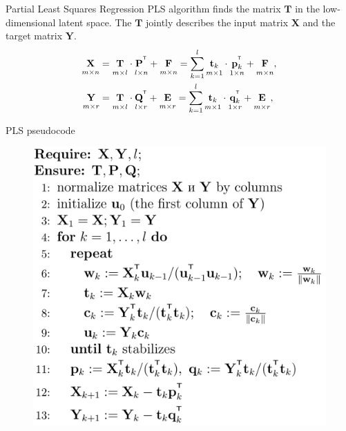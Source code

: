 \documentclass{beamer}
\newcommand{\bY}{\mathbf{Y}}
\newcommand{\bX}{\mathbf{X}}
\newcommand{\bt}{\mathbf{t}}
\newcommand{\bp}{\mathbf{p}}
\newcommand{\bq}{\mathbf{q}}
\newcommand{\bP}{\mathbf{P}}
\newcommand{\bT}{\mathbf{T}}
\newcommand{\bQ}{\mathbf{Q}}
\newcommand{\bE}{\mathbf{E}}
\newcommand{\bF}{\mathbf{F}}
\newcommand{\T}{^{\text{\tiny\sffamily\upshape\mdseries T}}}
\begin{document}
\begin{frame}{Partial Least Squares Regression}
	PLS algorithm finds the matrix $\bT$ in the low-dimensional latent space. The $\bT$ jointly describes the input matrix $\bX$ and the target matrix $\bY$.
	\begin{align*}
	\underset{m \times n}{\vphantom{\bQ}\bX} 
	&= \underset{m \times l}{\vphantom{\bQ}\bT} \cdot \underset{l \times n}{\vphantom{\bQ}\bP^{\T}} + \underset{m \times n}{\vphantom{\bQ}\bF} 
	= \sum_{k=1}^l \underset{m \times 1}{\vphantom{\bp_k^{\T}}\bt_k} \cdot \underset{1 \times n}{\bp_k^{\T}} + \underset{m \times n}{\vphantom{\bp_k^{\T}}\bF},\\
	\underset{m \times r}{\vphantom{\bQ}\bY} 
	&= \underset{m \times l}{\vphantom{\bQ}\bT} \cdot \underset{l \times r}{\bQ^{\T}} + \underset{m \times r}{\vphantom{\bQ}\bE}
	=  \sum_{k=1}^l  \underset{m \times 1}{\vphantom{\bq_k^{\T}}\bt_k} \cdot \underset{1 \times r}{\bq_k^{\T}} +  \underset{m \times r}{\vphantom{\bq_k^{\T}}\bE},
	\end{align*}
\end{frame}
\begin{frame}{PLS pseudocode}
\begin{figure}
	\begin{flushleft}
	\includegraphics[width=0.7\linewidth]{figs/pls_pseudocode}
\end{flushleft}
\end{figure}
\end{frame}
\end{document}
